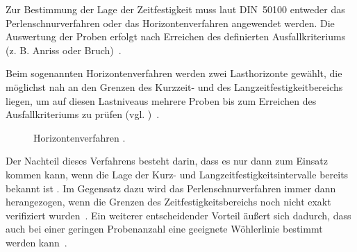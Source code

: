 Zur Bestimmung der Lage der Zeitfestigkeit muss laut DIN~50100 entweder das Perlenschnurverfahren oder das Horizontenverfahren angewendet werden. Die Auswertung der Proben erfolgt nach Erreichen des definierten Ausfallkriteriums (z. B. Anriss oder Bruch)~\cite[Seite~25--26]{DIN50100}.

Beim sogenannten Horizontenverfahren werden zwei Lasthorizonte gewählt, die möglichst nah an den Grenzen des Kurzzeit- und des Langzeitfestigkeitbereichs liegen, um auf diesen Lastniveaus mehrere Proben bis zum Erreichen des Ausfallkriteriums zu prüfen (vgl. )~\cite[Seite~26]{Dissertation_Woehler}.

\begin{figure}[H]
    \centering
        \caption{Horizontenverfahren \cite[Seite 26]{Dissertation_Woehler}.}
        \label{fig:Diagramm_Horizontenverfahren}
\end{figure}

Der Nachteil dieses Verfahrens besteht darin, dass es nur dann zum Einsatz kommen kann, wenn die Lage der Kurz- und Langzeitfestigkeitsintervalle bereits bekannt ist \cite[Seite 273]{Eulitz2022}. Im Gegensatz dazu wird das Perlenschnurverfahren immer dann herangezogen, wenn die Grenzen des Zeitfestigkeitsbereichs noch nicht exakt verifiziert wurden~\cite[Seite~26]{DIN50100}. Ein weiterer entscheidender Vorteil äußert sich dadurch, dass auch bei einer geringen Probenanzahl eine geeignete Wöhlerlinie bestimmt werden kann~\cite[Seite~278]{Eulitz2022}.  

